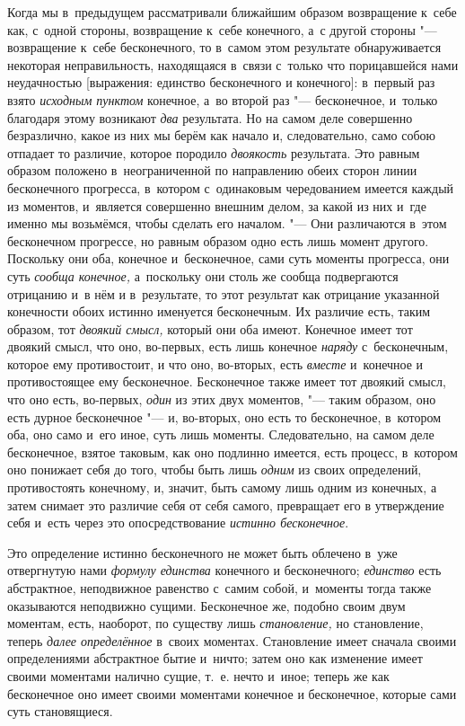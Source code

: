 Когда мы в~предыдущем рассматривали ближайшим образом возвращение к~себе
как, с~одной стороны, возвращение к~себе конечного, а~с другой стороны
"--- возвращение к~себе бесконечного, то в~самом этом результате
обнаруживается некоторая неправильность, находящаяся в~связи с~только что
порицавшейся нами неудачностью [выражения: единство бесконечного и
конечного]: в~первый раз взято {\em исходным пунктом}
конечное, а~во второй раз "--- бесконечное, и~только благодаря этому возникают
{\em два} результата. Но на самом деле совершенно
безразлично, какое из них мы берём как начало и, следовательно, само собою
отпадает то различие, которое породило {\em двоякость}
результата. Это равным образом положено в~неограниченной по направлению
обеих сторон линии бесконечного прогресса, в~котором с~одинаковым
чередованием имеется каждый из моментов, и~является совершенно внешним
делом, за какой из них и~где именно мы возьмёмся, чтобы сделать его
началом. "--- Они различаются в~этом бесконечном прогрессе, но равным образом
одно есть лишь момент другого. Поскольку они оба, конечное и~бесконечное,
сами суть моменты прогресса, они суть {\em сообща
конечное,} а~поскольку они столь же сообща подвергаются отрицанию и~в нём и
в~результате, то этот результат как отрицание указанной конечности обоих
истинно именуется бесконечным. Их различие есть, таким образом, тот
{\em двоякий смысл,} который они оба имеют. Конечное
имеет тот двоякий смысл, что оно, во-первых, есть лишь конечное
{\em наряду} с~бесконечным, которое ему противостоит, и
что оно, во-вторых, есть {\em вместе} и~конечное и
противостоящее ему бесконечное. Бесконечное также имеет тот двоякий смысл,
что оно есть, во-первых, {\em один} из этих двух
моментов, "--- таким образом, оно есть дурное бесконечное "--- и, во-вторых, оно
есть то бесконечное, в~котором оба, оно само и~его иное, суть лишь
моменты. Следовательно, на самом деле бесконечное, взятое таковым, как оно
подлинно имеется, есть процесс, в~котором оно понижает себя до того, чтобы
быть лишь {\em одним} из своих определений,
противостоять конечному, и, значит, быть самому лишь одним из конечных, а
затем снимает это различие себя от себя самого, превращает его в
утверждение себя и~есть через это опосредствование
{\em истинно бесконечное}.

Это определение истинно бесконечного не может быть облечено в~уже
отвергнутую нами {\em формулу единства} конечного и
бесконечного; {\em единство} есть абстрактное,
неподвижное равенство с~самим собой, и~моменты тогда также оказываются неподвижно
сущими. Бесконечное же, подобно своим двум моментам, есть, наоборот, по
существу лишь {\em становление,} но становление, теперь
{\em далее определённое} в~своих моментах. Становление
имеет сначала своими определениями абстрактное бытие и~ничто; затем оно как
изменение имеет своими моментами налично сущие, т.~е. нечто и~иное;
теперь же как бесконечное оно имеет своими моментами конечное и
бесконечное, которые сами суть становящиеся.

